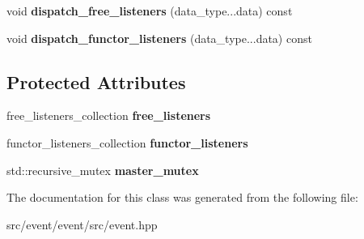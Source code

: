 \begin{DoxyCompactItemize}
\item 
\hypertarget{classxstd_1_1event_ac3a4cf6f6d139f3ab31cd3ca1ebb42e0}{void {\bfseries dispatch\-\_\-free\-\_\-listeners} (data\-\_\-type...\-data) const }\label{classxstd_1_1event_ac3a4cf6f6d139f3ab31cd3ca1ebb42e0}

\item 
\hypertarget{classxstd_1_1event_a3c82e7e9e05c4c44e65b32db7090bd3c}{void {\bfseries dispatch\-\_\-functor\-\_\-listeners} (data\-\_\-type...\-data) const }\label{classxstd_1_1event_a3c82e7e9e05c4c44e65b32db7090bd3c}

\end{DoxyCompactItemize}
\subsection*{Protected Attributes}
\begin{DoxyCompactItemize}
\item 
\hypertarget{classxstd_1_1event_a045873dfdf4fe07af8421d81592d3275}{free\-\_\-listeners\-\_\-collection {\bfseries free\-\_\-listeners}}\label{classxstd_1_1event_a045873dfdf4fe07af8421d81592d3275}

\item 
\hypertarget{classxstd_1_1event_a3e4c0ca4abd96a0af619cdb96e3cfef2}{functor\-\_\-listeners\-\_\-collection {\bfseries functor\-\_\-listeners}}\label{classxstd_1_1event_a3e4c0ca4abd96a0af619cdb96e3cfef2}

\item 
\hypertarget{classxstd_1_1event_afaaee3e44989122c9e1db6f4d1547de8}{std\-::recursive\-\_\-mutex {\bfseries master\-\_\-mutex}}\label{classxstd_1_1event_afaaee3e44989122c9e1db6f4d1547de8}

\end{DoxyCompactItemize}


The documentation for this class was generated from the following file\-:\begin{DoxyCompactItemize}
\item 
src/event/event/src/event.\-hpp\end{DoxyCompactItemize}
